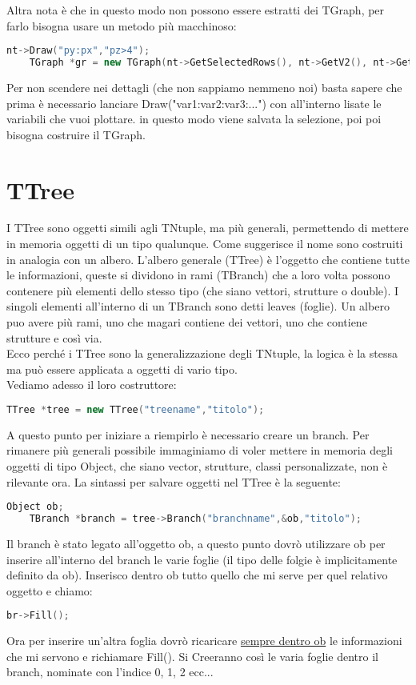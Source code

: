 Altra nota è che in questo modo non possono essere estratti dei TGraph, per farlo bisogna usare un metodo più macchinoso:
\begin{lstlisting}[language=C++,label={cod1},mathescape=true,breaklines=true]
	nt->Draw("py:px","pz>4");
	TGraph *gr = new TGraph(nt->GetSelectedRows(), nt->GetV2(), nt->GetV1());
\end{lstlisting}
Per non scendere nei dettagli (che non sappiamo nemmeno noi) basta sapere che prima è necessario lanciare Draw("var1:var2:var3:...") con all'interno lisate le variabili che vuoi plottare. in questo modo viene salvata la selezione, poi poi bisogna costruire il TGraph.\\

\section{TTree}
I TTree sono oggetti simili agli TNtuple, ma più generali, permettendo di mettere in memoria oggetti di un tipo qualunque.
Come suggerisce il nome sono costruiti in analogia con un albero. L'albero generale (TTree) è l'oggetto che contiene tutte le informazioni, queste si dividono in rami (TBranch) che a loro volta possono contenere più elementi dello stesso tipo (che siano vettori, strutture o double). I singoli elementi all'interno di un TBranch sono detti leaves (foglie). Un albero puo avere più rami, uno che magari contiene dei vettori, uno che contiene strutture e così via.\\
Ecco perché i TTree sono la generalizzazione degli TNtuple, la logica è la stessa ma può essere applicata a oggetti di vario tipo.\\
Vediamo adesso il loro costruttore:
\begin{lstlisting}[language=C++,label={cod1},mathescape=true,breaklines=true]
	TTree *tree = new TTree("treename","titolo");
\end{lstlisting}
A questo punto per iniziare a riempirlo è necessario creare un branch. Per rimanere più generali possibile immaginiamo di voler mettere in memoria degli oggetti di tipo Object, che siano vector, strutture, classi personalizzate, non è rilevante ora. La sintassi per salvare oggetti nel TTree è la seguente:
\begin{lstlisting}[language=C++,label={cod1},mathescape=true,breaklines=true]
	Object ob;
	TBranch *branch = tree->Branch("branchname",&ob,"titolo");
\end{lstlisting}
Il branch è stato legato all'oggetto ob, a questo punto dovrò utilizzare ob per inserire all'interno del branch le varie foglie (il tipo delle folgie è implicitamente definito da ob). Inserisco dentro ob tutto quello che mi serve per quel relativo oggetto e chiamo:
\begin{lstlisting}[language=C++,label={cod1},mathescape=true,breaklines=true]
	br->Fill();
\end{lstlisting}
Ora per inserire un'altra foglia dovrò ricaricare \underline{sempre dentro ob} le informazioni che mi servono e richiamare Fill(). Si Creeranno così le varia foglie dentro il branch, nominate con l'indice 0, 1, 2 ecc...

